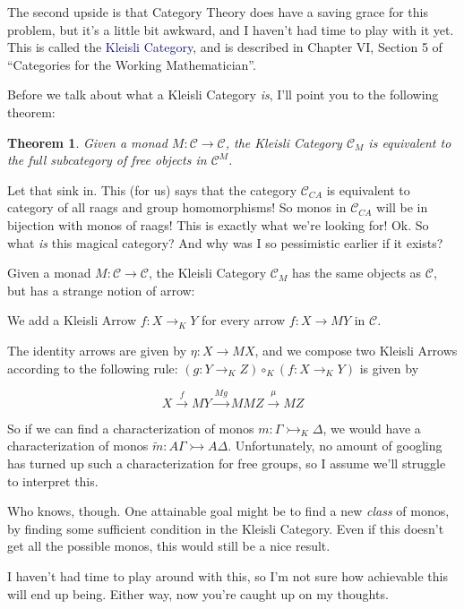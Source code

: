 \documentclass[12pt]{article}
\newtheorem{thm}{Theorem}
\theoremstyle{definition}
\newcommand*{\catVarFont}[1]{\mathcal{#1}}
\newcommand{\catc}{\catVarFont{C}}
\newcommand{\monor}{\rightarrowtail}
\newcommand*{\important}[1]{\textcolor{MidnightBlue}{#1}}
\begin{document}
The second upside is that Category Theory does have a saving grace for this
problem, but it's a little bit awkward, and I haven't had time to play with
it yet. This is called the \important{Kleisli Category}, and is described in
Chapter VI, Section 5 of ``Categories for the Working Mathematician''.

Before we talk about what a Kleisli Category \emph{is}, I'll point you 
to the following theorem:

\begin{thm}
Given a monad $M : \catc \to \catc$, the Kleisli Category $\catc_M$ is
equivalent to the full subcategory of free objects in $\catc^M$.
\end{thm}

Let that sink in. This (for us) says that the category $\catc_{CA}$ is
equivalent to category of all raags and group homomorphisms! So monos
in $\catc_{CA}$ will be in bijection with monos of raags! This is exactly
what we're looking for!
Ok. So what \emph{is} this magical category? And why was I so pessimistic
earlier if it exists?

Given a monad $M : \catc \to \catc$, the Kleisli Category $\catc_M$ 
has the same objects as $\catc$, but has a strange notion of arrow:

We add a Kleisli Arrow $f : X \to_K Y$ for every arrow $f : X \to MY$ in $\catc$.

The identity arrows are given by $\eta : X \to MX$, and we
compose two Kleisli Arrows according to the following rule:
$(g : Y \to_K Z) \circ_K (f : X \to_K Y)$ is given by

\[ X \overset{f}{\to} MY \overset{Mg}{\to} MMZ \overset{\mu}{\to} MZ \]

So if we can find a characterization of monos $m : \Gamma \monor_K \Delta$,
we would have a characterization of monos $\tilde{m} : A \Gamma \monor A \Delta$.
Unfortunately, no amount of googling has turned up such a characterization 
for free groups, so I assume we'll struggle to interpret this. 

Who knows, though. One attainable goal might be to find a new \emph{class} 
of monos, by finding some sufficient condition in the Kleisli Category.
Even if this doesn't get all the possible monos, this would still be a 
nice result.

I haven't had time to play around with this, so I'm not sure how
achievable this will end up being. Either way, now you're caught up 
on my thoughts.


% 
% 
\end{document}
